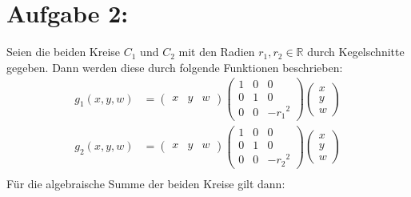 \section*{Aufgabe 2: }
Seien die beiden Kreise $C_1$ und $C_2$ mit den Radien $r_1, r_2 \in \mathbb{R}$ durch Kegelschnitte gegeben.
Dann werden diese durch folgende Funktionen beschrieben:
\begin{align*}
  g_1(x, y, w) &= \left(\begin{matrix}x &y& w\end{matrix}\right)\left(\begin{matrix}1&0&0\\0&1&0\\0&0&-{r_1}^2\end{matrix}\right)\left(\begin{matrix}x\\y\\w\end{matrix}\right)\\
  g_2(x, y, w) &= \left(\begin{matrix}x &y& w\end{matrix}\right)\left(\begin{matrix}1&0&0\\0&1&0\\0&0&-{r_2}^2\end{matrix}\right)\left(\begin{matrix}x\\y\\w\end{matrix}\right)\\
\end{align*}
Für die algebraische Summe der beiden Kreise gilt dann:
